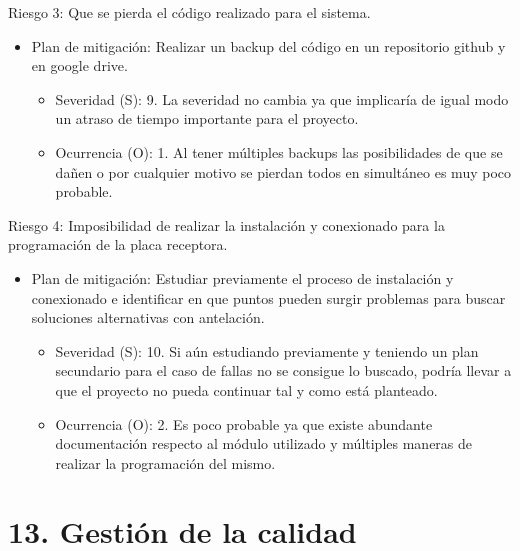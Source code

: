 \documentclass[11pt]{charter}
\begin{document}
Riesgo 3: Que se pierda el código realizado para el sistema.
\begin{itemize}
\item Plan de mitigación: Realizar un backup del código en un repositorio github y en google drive.
	\begin{itemize}
	\item Severidad (S): 9. La severidad no cambia ya que implicaría de igual modo un atraso de tiempo importante para el proyecto.
	\item Ocurrencia (O): 1. Al tener múltiples backups las posibilidades de que se dañen o por cualquier motivo se pierdan todos en simultáneo es muy poco probable.
	\end{itemize}
\end{itemize}
 
Riesgo 4: Imposibilidad de realizar la instalación y conexionado para la programación de la placa receptora.
\begin{itemize}
\item Plan de mitigación: Estudiar previamente el proceso de instalación y conexionado e identificar en que puntos pueden surgir problemas para buscar soluciones alternativas con antelación. 
	\begin{itemize}
	\item Severidad (S): 10. Si aún estudiando previamente y teniendo un plan secundario para el caso de fallas no se consigue lo buscado, podría llevar a que el proyecto no pueda continuar tal y como está planteado.
	\item Ocurrencia (O): 2. Es poco probable ya que existe abundante documentación respecto al módulo utilizado y múltiples maneras de realizar la programación del mismo.
	\end{itemize}
\end{itemize}


\section{13. Gestión de la calidad}
\label{sec:calidad}
\end{document}

